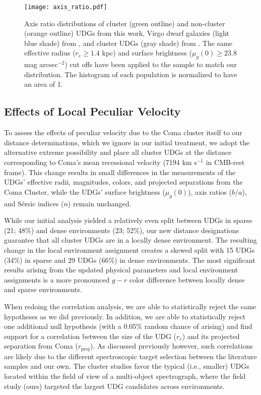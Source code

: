 \documentclass[twocolumn,tighten]{aastex63}
\begin{document}
\begin{figure}[t]
\texttt{[image: axis\_ratio.pdf]}
\caption{Axis ratio distributions of cluster (green outline) and non-cluster (orange outline) UDGs from this work, Virgo dwarf galaxies (light blue shade) from \cite{Chen2010}, and cluster UDGs (gray shade) from \cite{Yagi2016}. The same effective radius ($r_e \geq 1.4$ kpc) and surface brightness ($\mu_g(0) \geq 23.8$ mag arcsec$^{-2}$) cut offs have been applied to the \cite{Yagi2016} sample to match our distribution. The histogram of each population is normalized to have an area of 1.}
\label{fig:axis_ratio}
\end{figure}

\subsection{Effects of Local Peculiar Velocity}
\label{pecular_velocity}

To assess the effects of peculiar velocity due to the Coma cluster itself to our distance determinations, which we ignore in our initial treatment,  we adopt the alternative extreme possibility and place 
all cluster UDGs at the distance corresponding to Coma's mean recessional velocity (7194 km s$^{-1}$ in CMB-rest frame).
This change results in small differences in the measurements of the UDGs’ effective radii, magnitudes, colors, and projected separations from the Coma Cluster, while the UDGs' surface brightness ($\mu_g(0)$), axis ratios ($b/a$), and S\'{e}rsic indices ($n$) remain unchanged. 

While our initial analysis yielded a relatively even split between UDGs in sparse (21; 48\%) and dense environments (23; 52\%), our new distance designations guarantee that all cluster UDGs are in a locally dense environment. The resulting change in the local environment assignment creates a skewed split with 15 UDGs (34\%) in sparse and 29 UDGs (66\%) in dense environments. The most significant results arising from the updated physical parameters and local environment assignments is a more pronounced $g-r$ color difference between locally dense and sparse environments.
 
When redoing the correlation analysis, we are able to statistically reject the same hypotheses as we did previously.
In addition, we are able to statistically reject one additional null hypothesis (with a 0.05\% random chance of arising) and find support for a correlation between the size of the UDG ($r_e$) and its projected separation from Coma ($r_\mathrm{proj}$). As discussed previously however, such correlations are likely due to the different spectroscopic target selection between the literature samples and our own. 
The cluster studies favor the typical (i.e., smaller) UDGs located within the field of view of a multi-object spectrograph, where the field study (ours) targeted the largest UDG candidates across environments.
\end{document}
